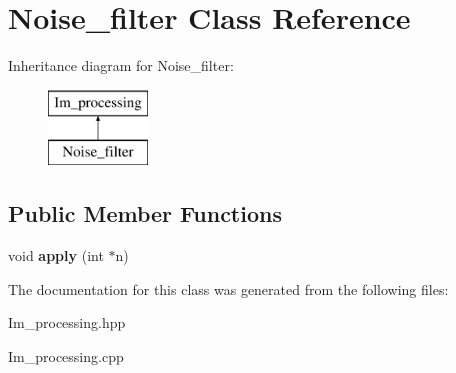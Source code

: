 \hypertarget{class_noise__filter}{\section{Noise\+\_\+filter Class Reference}
\label{class_noise__filter}
}
Inheritance diagram for Noise\+\_\+filter\+:\begin{figure}[H]
\begin{center}
\leavevmode
\includegraphics[height=2.000000cm]{class_noise__filter}
\end{center}
\end{figure}
\subsection*{Public Member Functions}
\begin{DoxyCompactItemize}
\item 
\hypertarget{class_noise__filter_aeb680eda9dc62351d67c0a89a26bc3f4}{void {\bfseries apply} (int $\ast$n)}\label{class_noise__filter_aeb680eda9dc62351d67c0a89a26bc3f4}

\end{DoxyCompactItemize}


The documentation for this class was generated from the following files\+:\begin{DoxyCompactItemize}
\item 
Im\+\_\+processing.\+hpp\item 
Im\+\_\+processing.\+cpp\end{DoxyCompactItemize}

